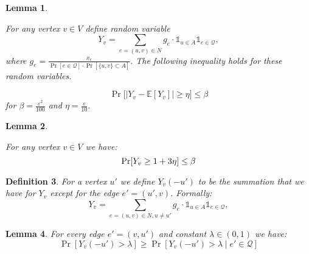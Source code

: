 \documentclass[letterpaper,11pt]{article}
\renewcommand{\epsilon}{\varepsilon}
\renewcommand{\epsilon}[0]{\ensuremath{\varepsilon}}
\let\originalleft\left
\let\originalright\right
\renewcommand{\left}{\mathopen{}\mathclose\bgroup\originalleft}
\renewcommand{\right}{\aftergroup\egroup\originalright}
\newtheorem{lemma}{Lemma}[section]
\newtheorem{definition}[lemma]{Definition}
\begin{document}
\newcommand{\besttau}{\ensuremath{\frac{1}{\epsilon t}}\xspace}
\newcommand{\besttQAlg}{\ensuremath{\frac{1}{\delta^2 p_{min} \epsilon^{3}}}\xspace}
\newcommand{\Inf}{\ensuremath{I}\xspace}




\newcommand{\difffrommu}{\ensuremath{\epsilon}\xspace}
\newcommand{\lemboundedy}[0]{
For any vertex  $v\in V$ define random variable $$Y_v = \sum_{e=(u,v) \in N} g_{e} \cdot\mathds{1}_{u\in A}  \mathds{1}_{e\in \mathcal{Q}}, $$
where $g_e=\frac{x_e}{\Pr[e \in \mathcal{Q}]\cdot\Pr[\{u, v\} \subset A]}.$
The following inequality holds for these random variables.

$$\Pr\Big[|Y_v - \mathbb{E}[Y_v]| \geq \eta \Big] \leq \beta$$
 for $\beta= \frac{\epsilon^2}{100}$ and $\eta=\frac{\epsilon}{10}.$
 
}

\begin{lemma}
\label{lem:boundedvary}
\lemboundedy
\end{lemma}

\newcommand{\lemyvaboutone}[0]{
 For any vertex $v\in  V$ we have:
    $$
     \Pr\left[ Y_v\geq 1+3\eta\right]\leq \beta
    $$
}

\begin{lemma}
\label{lem:yvclose1}
\lemyvaboutone
\end{lemma}


\begin{definition}
    For a vertex $u'$ we define $Y_v(-u')$ to be the summation that we have for $Y_v$ except for the edge $e' = (u', v)$. Formally:
    $$Y_v = \sum_{e=(u,v) \in N, u \neq u'} g_{e} \cdot\mathds{1}_{u\in A}  \mathds{1}_{e\in \mathcal{Q}}, $$
\end{definition}
\newcommand{\Aset}{\ensuremath{\bm{A}}\xspace}
\newcommand{\qstar}{\ensuremath{\mathcal{Q}}\xspace}
\newcommand{\rva}{\ensuremath{S_A}\xspace}
\newcommand{\rvq}{\ensuremath{S_Q}\xspace}
\newcommand{\Cov}{\ensuremath{Cov}\xspace}

\begin{lemma}\label{lem:condeinQlowerbound}
    For every edge $e' = (v, u')$ and constant $\lambda \in (0,1)$ we have:
    $$\Pr[Y_v(-u') > \lambda] \geq \Pr[Y_v(-u') > \lambda \mid e' \in \mathcal{Q}]$$
\end{lemma}
\end{document}
